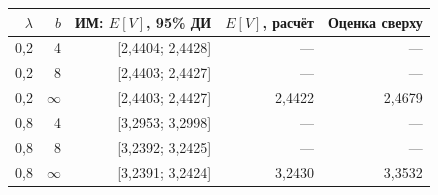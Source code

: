 \begin{tabular}{rrrrr}
\hline
$\lambda$ & $b$ & ИМ: $E[V]$, 95\% ДИ & $E[V]$, расчёт & Оценка сверху \\
\hline
0,2 & 4 & [2,4404; 2,4428] & --- & --- \\
0,2 & 8 & [2,4403; 2,4427] & --- & --- \\
0,2 & $\infty$ & [2,4403; 2,4427] & 2,4422 & 2,4679 \\
0,8 & 4 & [3,2953; 3,2998] & --- & --- \\
0,8 & 8 & [3,2392; 3,2425] & --- & --- \\
0,8 & $\infty$ & [3,2391; 3,2424] & 3,2430 & 3,3532 \\
\hline
\end{tabular}
